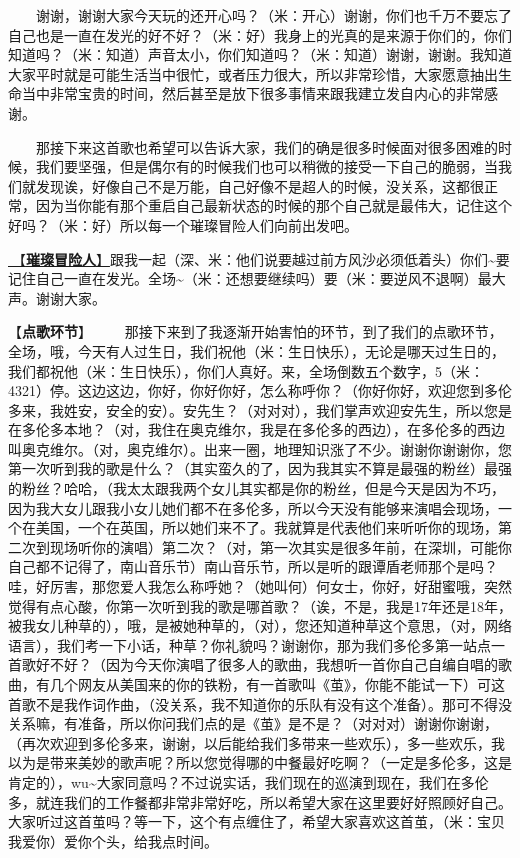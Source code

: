 \documentclass[]{ctexbook}
\begin{document}
  谢谢，谢谢大家今天玩的还开心吗？（米：开心）谢谢，你们也千万不要忘了自己也是一直在发光的好不好？（米：好）我身上的光真的是来源于你们的，你们知道吗？（米：知道）声音太小，你们知道吗？（米：知道）谢谢，谢谢。我知道大家平时就是可能生活当中很忙，或者压力很大，所以非常珍惜，大家愿意抽出生命当中非常宝贵的时间，然后甚至是放下很多事情来跟我建立发自内心的非常感谢。

  那接下来这首歌也希望可以告诉大家，我们的确是很多时候面对很多困难的时候，我们要坚强，但是偶尔有的时候我们也可以稍微的接受一下自己的脆弱，当我们就发现诶，好像自己不是万能，自己好像不是超人的时候，没关系，这都很正常，因为当你能有那个重启自己最新状态的时候的那个自己就是最伟大，记住这个好吗？（米：好）所以每一个璀璨冒险人们向前出发吧。

\hyperref[adventurers]{🎵【\textbf{璀璨冒险人}】}跟我一起（深、米：他们说要越过前方风沙必须低着头）你们\textasciitilde 要记住自己一直在发光。全场\textasciitilde（米：还想要继续吗）要（米：要逆风不退啊）最大声。谢谢大家。

【\textbf{点歌环节}】
  那接下来到了我逐渐开始害怕的环节，到了我们的点歌环节，全场，哦，今天有人过生日，我们祝他（米：生日快乐），无论是哪天过生日的，我们都祝他（米：生日快乐），你们人真好。来，全场倒数五个数字，5（米：4321）停。这边这边，你好，你好你好，怎么称呼你？（你好你好，欢迎您到多伦多来，我姓安，安全的安）。安先生？（对对对），我们掌声欢迎安先生，所以您是在多伦多本地？（对，我住在奥克维尔，我是在多伦多的西边），在多伦多的西边叫奥克维尔。（对，奥克维尔）。出来一圈，地理知识涨了不少。谢谢你谢谢你，您第一次听到我的歌是什么？（其实蛮久的了，因为我其实不算是最强的粉丝）最强的粉丝？哈哈，（我太太跟我两个女儿其实都是你的粉丝，但是今天是因为不巧，因为我大女儿跟我小女儿她们都不在多伦多，所以今天没有能够来演唱会现场，一个在美国，一个在英国，所以她们来不了。我就算是代表他们来听听你的现场，第二次到现场听你的演唱）第二次？（对，第一次其实是很多年前，在深圳，可能你自己都不记得了，南山音乐节）南山音乐节，所以是听的跟谭盾老师那个是吗？哇，好厉害，那您爱人我怎么称呼她？（她叫何）何女士，你好，好甜蜜哦，突然觉得有点心酸，你第一次听到我的歌是哪首歌？（诶，不是，我是17年还是18年，被我女儿种草的），哦，是被她种草的，（对），您还知道种草这个意思，（对，网络语言），我们考一下小话，种草？你礼貌吗？谢谢你，那为我们多伦多第一站点一首歌好不好？（因为今天你演唱了很多人的歌曲，我想听一首你自己自编自唱的歌曲，有几个网友从美国来的你的铁粉，有一首歌叫《茧》，你能不能试一下）可这首歌不是我作词作曲，（没关系，我不知道你的乐队有没有这个准备）。那可不得没关系嘛，有准备，所以你问我们点的是《茧》是不是？（对对对）谢谢你谢谢，（再次欢迎到多伦多来，谢谢，以后能给我们多带来一些欢乐），多一些欢乐，我以为是带来美妙的歌声呢？所以您觉得哪的中餐最好吃啊？（一定是多伦多，这是肯定的），wu\textasciitilde 大家同意吗？不过说实话，我们现在的巡演到现在，我们在多伦多，就连我们的工作餐都非常非常好吃，所以希望大家在这里要好好照顾好自己。大家听过这首茧吗？等一下，这个有点缠住了，希望大家喜欢这首茧，（米：宝贝我爱你）爱你个头，给我点时间。
\end{document}
